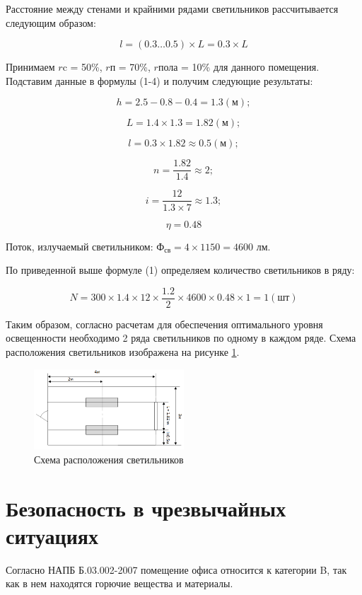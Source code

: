 Расстояние между стенами и крайними рядами светильников рассчитывается следующим образом:

\[
    l = (0.3 \ldots 0.5) \times L = 0.3 \times L
\]

Принимаем $r{\text{c}}$ = 50\%, $r{\text{п}}$ = 70\%,  $r{\text{пола}}$ = 10\% для данного помещения.
Подставим данные в формулы (1-4) и получим следующие результаты:

\[
    h = 2.5 - 0.8 - 0.4 = 1.3 (\text{м});
\]

\[
    L = 1.4 \times 1.3 = 1.82 (\text{м});
\]

\[
    l = 0.3 \times 1.82 \approx 0.5 (\text{м});
\]

\[
    n = \dfrac {1.82}{1.4} \approx 2;
\]

\[
    i = \dfrac {12}{1.3 \times 7} \approx 1.3;
\]

\[
    \eta = 0.48
\]

Поток, излучаемый светильником: ${\text{Ф}}_{\text{св}} = 4 \times 1150 = 4600$ лм.

По приведенной выше формуле (1) определяем количество светильников в ряду:

\[
    N = 300 \times 1.4 \times 12 \times {\dfrac{1.2}{2}} \times 4600 \times 0.48 \times 1 = 1 (\text{шт})
\]

Таким образом, согласно расчетам для обеспечения оптимального уровня освещенности необходимо 2 ряда светильников по
одному в каждом ряде. Схема расположения светильников изображена на рисунке \ref{fig:torch}.

\begin{figure}[!ht]
    \centering
    \includegraphics[width=0.5\textwidth]{graphics/torch.png}
    \caption{Схема расположения светильников}
    \label{fig:torch}
\end{figure}

\section{Безопасность в чрезвычайных ситуациях}

Согласно НАПБ Б.03.002-2007 помещение офиса относится к категории B,
так как в нем находятся горючие вещества и материалы. 

